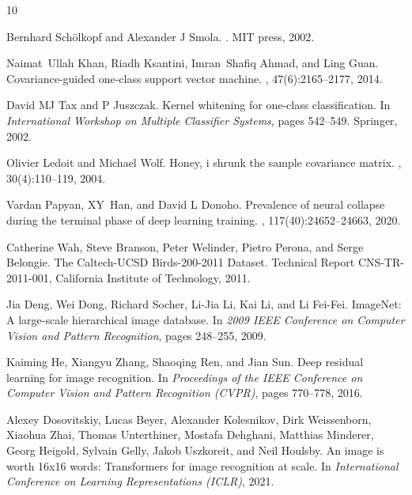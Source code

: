 \documentclass[11pt]{article}
\begin{document}

\begin{thebibliography}{10}

Bernhard Schölkopf and Alexander J Smola.
.
\newblock MIT press, 2002.

Naimat~Ullah Khan, Riadh Ksantini, Imran~Shafiq Ahmad, and Ling Guan.
\newblock Covariance-guided one-class support vector machine.
, 47(6):2165--2177, 2014.

David MJ Tax and P Juszczak.
\newblock Kernel whitening for one-class classification.
\newblock In {\em International Workshop on Multiple Classifier Systems}, pages 542--549. Springer, 2002.

Olivier Ledoit and Michael Wolf.
\newblock Honey, i shrunk the sample covariance matrix.
, 30(4):110--119, 2004.

Vardan Papyan, XY~Han, and David L Donoho.
\newblock Prevalence of neural collapse during the terminal phase of deep learning training.
, 117(40):24652--24663, 2020.

Catherine Wah, Steve Branson, Peter Welinder, Pietro Perona, and Serge Belongie.
\newblock The Caltech-UCSD Birds-200-2011 Dataset.
\newblock Technical Report CNS-TR-2011-001, California Institute of Technology, 2011.

Jia Deng, Wei Dong, Richard Socher, Li-Jia Li, Kai Li, and Li Fei-Fei.
\newblock ImageNet: A large-scale hierarchical image database.
\newblock In {\em 2009 IEEE Conference on Computer Vision and Pattern Recognition}, pages 248--255, 2009.

Kaiming He, Xiangyu Zhang, Shaoqing Ren, and Jian Sun.
\newblock Deep residual learning for image recognition.
\newblock In {\em Proceedings of the IEEE Conference on Computer Vision and Pattern Recognition (CVPR)}, pages 770--778, 2016.

Alexey Dosovitskiy, Lucas Beyer, Alexander Kolesnikov, Dirk Weissenborn, Xiaohua Zhai, Thomas Unterthiner, Mostafa Dehghani, Matthias Minderer, Georg Heigold, Sylvain Gelly, Jakob Uszkoreit, and Neil Houlsby.
\newblock An image is worth 16x16 words: Transformers for image recognition at scale.
\newblock In {\em International Conference on Learning Representations (ICLR)}, 2021.


\end{thebibliography}
\end{document}
